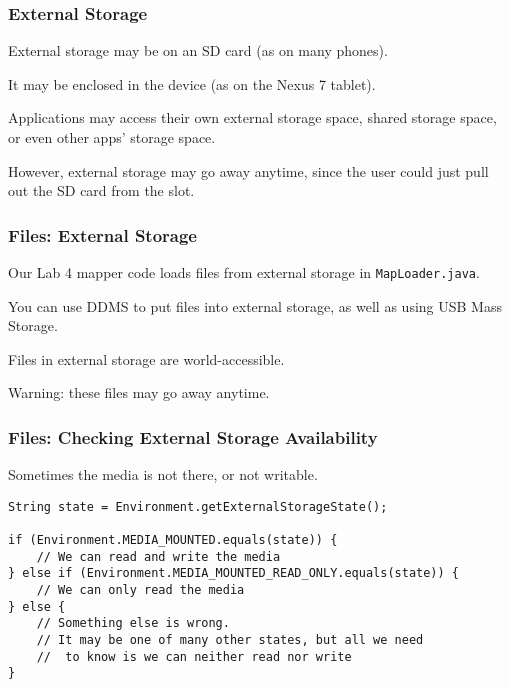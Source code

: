 \begin{frame}
\frametitle{External Storage}
\begin{changemargin}{1cm}

External storage may be on an SD card (as on many phones).

It may be
enclosed in the device (as on the Nexus 7 tablet). 

Applications may access
their own external storage space, shared storage space, or even other
apps' storage space. 

However, external storage may go away anytime, since
the user could just pull out the SD card from the slot.

\end{changemargin}
\end{frame}

\begin{frame}
\frametitle{Files: External Storage}

\begin{changemargin}{1cm}
Our Lab 4 mapper code loads files from external storage in {\tt MapLoader.java}.

You can use DDMS to put files into external storage,
as well as using USB Mass Storage.

Files in external storage are world-accessible.

Warning: these files may go away anytime.
\end{changemargin}
\end{frame}

\begin{frame}[fragile]
\frametitle{Files: Checking External Storage Availability}

\begin{changemargin}{0.1cm}
Sometimes the media is not there, or not writable.
\begin{lstlisting}[basicstyle=\scriptsize]
String state = Environment.getExternalStorageState();

if (Environment.MEDIA_MOUNTED.equals(state)) {
    // We can read and write the media
} else if (Environment.MEDIA_MOUNTED_READ_ONLY.equals(state)) {
    // We can only read the media
} else {
    // Something else is wrong. 
    // It may be one of many other states, but all we need
    //  to know is we can neither read nor write
}
\end{lstlisting}
\end{changemargin}
\end{frame}

